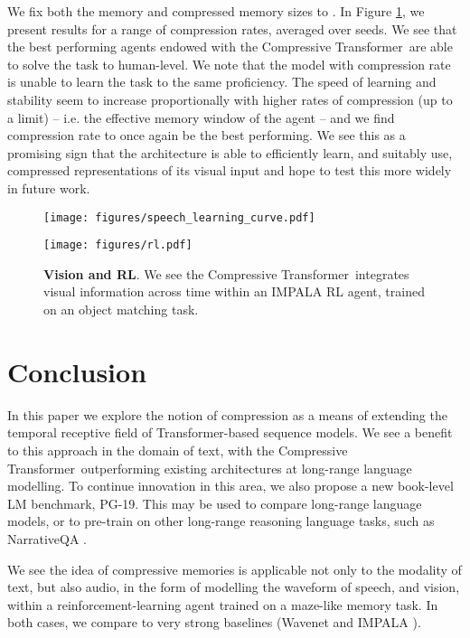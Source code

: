 \documentclass{article} \usepackage{iclr2020_conference,times}
\newcommand{\model}{Compressive Transformer}
\newcommand{\dataset}{PG-19}
\begin{document}
We fix both the memory and compressed memory sizes to . In Figure \ref{fig:rl}, we present results for a range of compression rates, averaged over  seeds. We see that the best performing agents endowed with the \model~are able to solve the task to human-level. We note that the model with compression rate  is unable to learn the task to the same proficiency. The speed of learning and stability seem to increase proportionally with higher rates of compression (up to a limit) -- i.e. the effective memory window of the agent -- and we find compression rate  to once again be the best performing. We see this as a promising sign that the architecture is able to efficiently learn, and suitably use,  compressed representations of its visual input and hope to test this more widely in future work. 
\begin{figure}[t]
\centering
\begin{minipage}{0.48\linewidth}
    \centering
    \texttt{[image: figures/speech\_learning\_curve.pdf]}
    \caption{\textbf{Speech Modelling.} We see the \model~is able to obtain competitive results against the state-of-the-art WaveNet in the modelling of raw speech sampled at 24kHz.}
    \label{fig:speech_curve}
\end{minipage}
\hspace{1em}
\begin{minipage}{0.48\linewidth}
    \centering
    \texttt{[image: figures/rl.pdf]}
    \caption{\textbf{Vision and RL}. We see the \model~integrates visual information across time within an IMPALA RL agent, trained on an object matching task.}
    \label{fig:rl}
\end{minipage}
\end{figure}
\section{Conclusion}
In this paper we explore the notion of compression as a means of extending the temporal receptive field of Transformer-based sequence models. We see a benefit to this approach in the domain of text, with the \model~outperforming existing architectures at long-range language modelling. To continue innovation in this area, we also propose a new book-level LM benchmark, \dataset. This may be used to compare long-range language models, or to pre-train on other long-range reasoning language tasks, such as NarrativeQA \citep{kovcisky2018narrativeqa}.

We see the idea of compressive memories is applicable not only to the modality of text, but also audio, in the form of modelling the waveform of speech, and vision, within a reinforcement-learning agent trained on a maze-like memory task. In both cases, we compare to very strong baselines (Wavenet \citep{oord2016wavenet} and IMPALA \citep{espeholt2018impala}).
\end{document}

